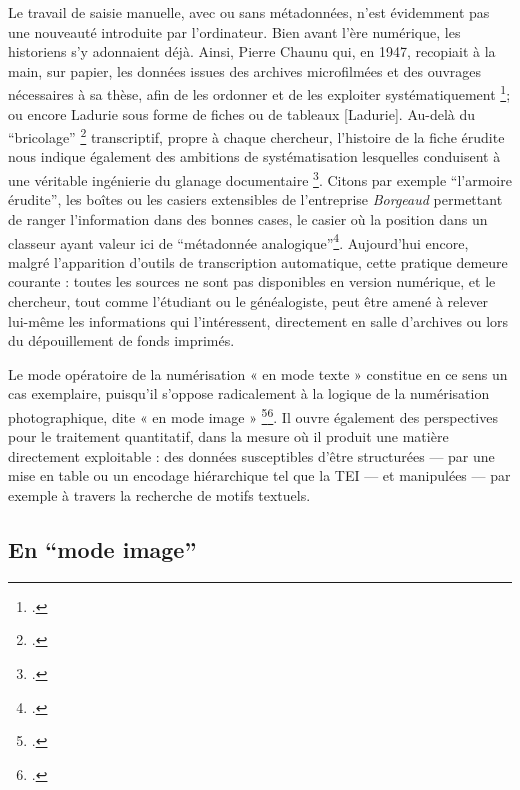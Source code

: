 Le travail de saisie manuelle, avec ou sans métadonnées, n’est évidemment pas une nouveauté introduite par l’ordinateur. Bien avant l’ère numérique, les historiens s’y adonnaient déjà. Ainsi, Pierre Chaunu qui, en 1947, recopiait à la main, sur papier, les données issues des archives microfilmées et des ouvrages nécessaires à sa thèse, afin de les ordonner et de les exploiter systématiquement \footcite[][]{muller}; ou encore Ladurie sous forme de fiches ou de tableaux [Ladurie]. Au-delà du \enquote{bricolage} \footcite[][]{levi-strauss} transcriptif, propre à chaque chercheur, l'histoire de la fiche érudite nous indique également des ambitions de systématisation lesquelles conduisent à une véritable ingénierie du glanage documentaire \footcite[][]{bert}. Citons par exemple \enquote{l'armoire érudite}, les boîtes ou les casiers extensibles de l'entreprise \emph{Borgeaud} permettant de ranger l'information dans des bonnes cases, le casier où la position dans un classeur ayant valeur ici de \enquote{métadonnée analogique}\footcite[][]{bert}. Aujourd’hui encore, malgré l’apparition d’outils de transcription automatique, cette pratique demeure courante : toutes les sources ne sont pas disponibles en version numérique, et le chercheur, tout comme l’étudiant ou le généalogiste, peut être amené à relever lui-même les informations qui l’intéressent, directement en salle d’archives ou lors du dépouillement de fonds imprimés. 

Le mode opératoire de la numérisation « en mode texte » constitue en ce sens un cas exemplaire, puisqu’il s’oppose radicalement à la logique de la numérisation photographique, dite « en mode image » \footcite[][]{bermesbook}\footcite[][]{claerr}. Il ouvre également des perspectives pour le traitement quantitatif, dans la mesure où il produit une matière directement exploitable : des données susceptibles d’être structurées — par une mise en table ou un encodage hiérarchique tel que la TEI — et manipulées — par exemple à travers la recherche de motifs textuels.

\subsection{En \enquote{mode image}}

